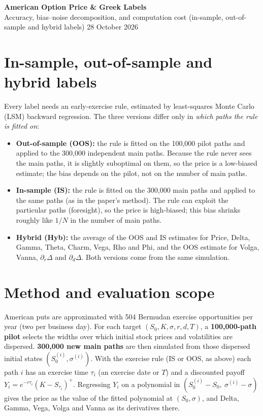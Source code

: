 \documentclass[10pt,letterpaper]{article}
\begin{document}
\fontsize{9.15}{11.15}\selectfont

{\fontsize{15}{18}\selectfont\bfseries\color{ink} American Option Price \& Greek Labels}\\[-1pt]
{\color{muted}\fontsize{10}{12}\selectfont Accuracy, bias--noise decomposition, and computation cost (in-sample, out-of-sample and hybrid labels) \hfill 28 October 2026}

\section*{In-sample, out-of-sample and hybrid labels}
Every label needs an early-exercise rule, estimated by least-squares Monte Carlo (LSM) backward
regression. The three versions differ only in \emph{which paths the rule is fitted on}:
\begin{itemize}\itemsep1pt
\item \textbf{Out-of-sample (OOS):} the rule is fitted on the 100,000 pilot paths and applied to the
300,000 independent main paths. Because the rule never sees the main paths, it is slightly
suboptimal on them, so the price is a low-biased estimate; the bias depends on the pilot, not on
the number of main paths.
\item \textbf{In-sample (IS):} the rule is fitted on the 300,000 main paths and applied to the same
paths (as in the paper's method). The rule can exploit the particular paths (foresight), so the
price is high-biased; this bias shrinks roughly like $1/N$ in the number of main paths.
\item \textbf{Hybrid (Hyb):} the average of the OOS and IS estimates for Price, Delta, Gamma, Theta,
Charm, Vega, Rho and Phi, and the OOS estimate for Volga, Vanna, $\partial_r\Delta$ and
$\partial_d\Delta$. Both versions come from the same simulation.
\end{itemize}

\section*{Method and evaluation scope}
American puts are approximated with 504 Bermudan exercise opportunities per year (two per business day).
For each target $(S_0,K,\sigma,r,d,T)$, a \textbf{100,000-path pilot} selects the widths over which
initial stock prices and volatilities are dispersed. \textbf{300,000 new main paths} are then simulated
from those dispersed initial states $(S_0^{(i)},\sigma^{(i)})$. With the exercise rule (IS or OOS, as
above) each path $i$ has an exercise time $\tau_i$ (an exercise date or $T$) and
a discounted payoff $Y_i=e^{-r\tau_i}(K-S_{\tau_i})^+$. Regressing $Y_i$ on a polynomial in
$(S_0^{(i)}-S_0,\ \sigma^{(i)}-\sigma)$ gives the price as the value of the fitted polynomial at
$(S_0,\sigma)$, and Delta, Gamma, Vega, Volga and Vanna as its derivatives there.
\end{document}
